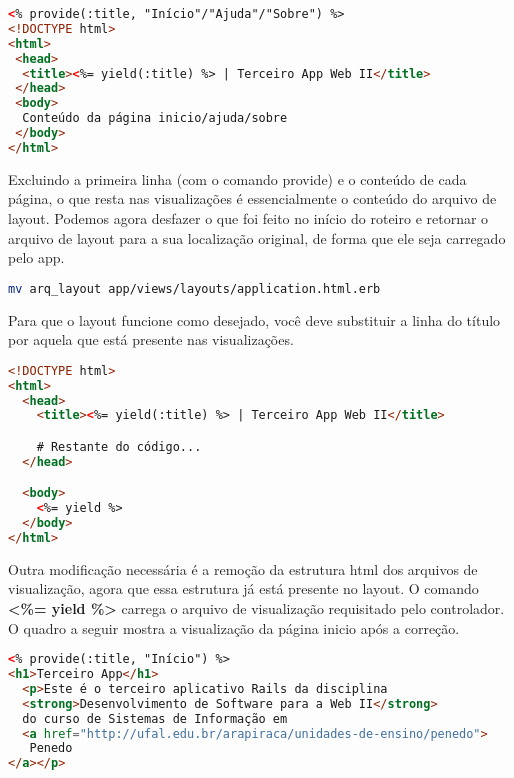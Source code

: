 \documentclass[a4paper,12pt]{article}
\begin{document}
\begin{enumerate}
  \begin{lstlisting}[language=html, basicstyle=\scriptsize]
<% provide(:title, "Início"/"Ajuda"/"Sobre") %>
<!DOCTYPE html>
<html>
 <head>
  <title><%= yield(:title) %> | Terceiro App Web II</title>
 </head>
 <body>
  Conteúdo da página inicio/ajuda/sobre
 </body>
</html>
  \end{lstlisting}

  Excluindo a primeira linha (com o comando provide) e o conteúdo de cada página, o que resta nas visualizações é essencialmente o conteúdo do arquivo de layout. Podemos agora desfazer o que foi feito no início do roteiro e retornar o arquivo de layout para a sua localização original, de forma que ele seja carregado pelo app.

  \begin{lstlisting}[language=Bash, title={terminal, dentro da pasta do terceiro app}]
mv arq_layout app/views/layouts/application.html.erb
  \end{lstlisting}

  Para que o layout funcione como desejado, você deve substituir a linha do título por aquela que está presente nas visualizações.

  \begin{lstlisting}[language=html, title=app/views/layouts/application.html.erb, basicstyle=\scriptsize]
<!DOCTYPE html>
<html>
  <head>
    <title><%= yield(:title) %> | Terceiro App Web II</title>

    # Restante do código...
  </head>

  <body>
    <%= yield %>
  </body>
</html>
  \end{lstlisting}

  Outra modificação necessária é a remoção da estrutura html dos arquivos de visualização, agora que essa estrutura já está presente no layout. O comando \textbf{<\%= yield \%>} carrega o arquivo de visualização requisitado pelo controlador. O quadro a seguir mostra a visualização da página inicio após a correção.

    \begin{lstlisting}[language=html, title=app/views/paginas\_estaticas/inicio.html.erb, basicstyle=\scriptsize]
<% provide(:title, "Início") %>
<h1>Terceiro App</h1>
  <p>Este é o terceiro aplicativo Rails da disciplina
  <strong>Desenvolvimento de Software para a Web II</strong>
  do curso de Sistemas de Informação em
  <a href="http://ufal.edu.br/arapiraca/unidades-de-ensino/penedo">
   Penedo
</a></p>
  \end{lstlisting}


\end{enumerate}
\end{document}
